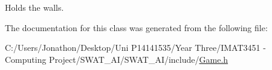 Holds the walls. 



The documentation for this class was generated from the following file\+:\begin{DoxyCompactItemize}
\item 
C\+:/\+Users/\+Jonathon/\+Desktop/\+Uni P14141535/\+Year Three/\+I\+M\+A\+T3451 -\/ Computing Project/\+S\+W\+A\+T\+\_\+\+A\+I/\+S\+W\+A\+T\+\_\+\+A\+I/include/\hyperlink{_game_8h}{Game.\+h}\end{DoxyCompactItemize}
